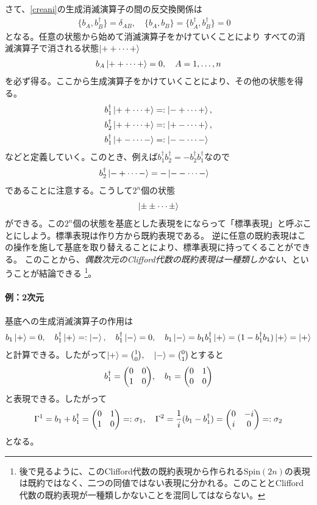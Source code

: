 \documentclass[12pt,a4paper,dvipdfmx]{jlreq}
\begin{document}
さて、\eqref{creani}の生成消滅演算子の間の反交換関係は
\begin{align}
  \{b_A,b_B^{\dag}\}=\delta_{AB},\quad
  \{b_A,b_B\}=
  \{b_A^{\dag},b_B^{\dag}\}=0\quad
\end{align}
となる。任意の状態から始めて消滅演算子をかけていくことにより
すべての消滅演算子で消される状態$\ket{++\dots+}$
\begin{align}
  b_A\ket{++\dots+}=0,\quad A=1,\dots,n
\end{align}
を必ず得る。ここから生成演算子をかけていくことにより、その他の状態を得る。
\begin{align}
  &b_1^{\dag}\ket{++\dots +}=:\ket{-+\dots +},\\
  &b_2^{\dag}\ket{++\dots +}=:\ket{+-\dots +},\\
  &b_1^{\dag}\ket{+-\dots -}=:\ket{--\dots -}
\end{align}
などと定義していく。このとき、例えば$b_1^{\dag}b_2^{\dag}=-b_2^{\dag}b_1^{\dag}$なので
\begin{align}
  &b_2^{\dag}\ket{-+\dots -}=-\ket{--\dots -}
\end{align}
であることに注意する。こうして$2^n$個の状態
\begin{align}
  \ket{\pm\pm\cdots\pm}
\end{align}
ができる。この$2^n$個の状態を基底とした表現を\cite{Kugo}にならって「標準表現」と呼ぶことにしよう。標準表現は作り方から既約表現である。
逆に任意の既約表現はこの操作を施して基底を取り替えることにより、標準表現に持ってくることができる。
このことから、\emph{偶数次元のClifford代数の既約表現は一種類しかない}、ということが結論できる
\footnote{後で見るように、このClifford代数の既約表現から作られるSpin$(2n)$の表現は既約ではなく、二つの同値ではない表現に分かれる。このこととClifford代数の既約表現が一種類しかないことを混同してはならない。}。

\paragraph{例：2次元}
基底への生成消滅演算子の作用は
\begin{align}
  b_1\ket{+}=0,\quad b_1^{\dag}\ket{+}=:\ket{-},\quad b_1^{\dag}\ket{-}=0,\quad b_1\ket{-}=b_1b_1^{\dag}\ket{+}
  =(1-b_1^{\dag}b_1)\ket{+}=\ket{+}
\end{align}
と計算できる。したがって$\ket{+}=\binom{1}{0},\quad \ket{-}=\binom{0}{1}$とすると
\begin{align*}
  b_1^{\dag}=
  \mqty(0&0\\1&0),\quad
  b_1=\mqty(0&1\\0&0)
\end{align*}
と表現できる。したがって
\begin{align*}
  \Gamma^{1}=b_1+b_1^{\dag}=\mqty(0&1\\  1&0)=:\sigma_1,\quad
  \Gamma^{2}=\frac{1}{i}(b_1-b_1^{\dag})=\mqty(0&-i\\  i&0)=:\sigma_2
\end{align*}
となる。
\end{document}
